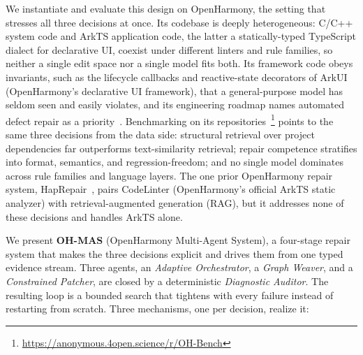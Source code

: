 \documentclass[10pt,conference]{IEEEtran}
\makeatletter
\def\cite{\just@cite} %
\makeatother
\begin{document}
We instantiate and evaluate this design on OpenHarmony, the setting that stresses all three decisions at once. Its codebase is deeply heterogeneous: C/C++ system code and ArkTS application code, the latter a statically-typed TypeScript dialect for declarative UI, coexist under different linters and rule families, so neither a single edit space nor a single model fits both. Its framework code obeys invariants, such as the lifecycle callbacks and reactive-state decorators of ArkUI (OpenHarmony's declarative UI framework), that a general-purpose model has seldom seen and easily violates, and its engineering roadmap names automated defect repair as a priority~\cite{li2025software}. Benchmarking on its repositories~\footnote{\url{https://anonymous.4open.science/r/OH-Bench}} points to the same three decisions from the data side: structural retrieval over project dependencies far outperforms text-similarity retrieval; repair competence stratifies into format, semantics, and regression-freedom; and no single model dominates across rule families and language layers. The one prior OpenHarmony repair system, HapRepair~\cite{lin2025haprepair}, pairs CodeLinter (OpenHarmony's official ArkTS static analyzer) with retrieval-augmented generation (RAG), but it addresses none of these decisions and handles ArkTS alone.

We present \textbf{OH-MAS} (OpenHarmony Multi-Agent System), a four-stage repair system that makes the three decisions explicit and drives them from one typed evidence stream. Three agents, an \emph{Adaptive Orchestrator}, a \emph{Graph Weaver}, and a \emph{Constrained Patcher}, are closed by a deterministic \emph{Diagnostic Auditor}. The resulting loop is a bounded search that tightens with every failure instead of restarting from scratch. Three mechanisms, one per decision, realize it:
\end{document}
